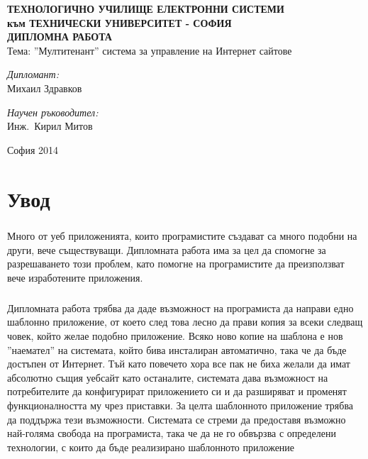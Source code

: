 \documentclass[pdftex,14pt,a4paper]{extreport}
\begin{document}
\setcounter{secnumdepth}{3}
\setcounter{tocdepth}{3}
\begin{titlepage}
	\begin{center}
    \textbf{\Large ТЕХНОЛОГИЧНО УЧИЛИЩЕ ЕЛЕКТРОННИ СИСТЕМИ\\[0.2cm]} \textbf{към ТЕХНИЧЕСКИ УНИВЕРСИТЕТ - СОФИЯ\\[6cm]}
		\textbf{\LARGE ДИПЛОМНА РАБОТА\\[4cm]}
		Тема: ''Мултитенант'' система за управление на Интернет сайтове\\[4cm]
		\begin{minipage}{0.4\textwidth}
			\begin{flushleft} \large
				\emph{Дипломант:}\\
				Михаил Здравков
			\end{flushleft}
		\end{minipage}
		\begin{minipage}{0.4\textwidth}
			\begin{flushright} \large
				\emph{Научен ръководител:} \\
				Инж.~Кирил Митов
			\end{flushright}
		\end{minipage}

		\vfill

		{\large София 2014}

	\end{center}
\end{titlepage}
\tableofcontents
\pagebreak
{}
\chapter*{Увод}
\paragraph {}
Много от уеб приложенията, които програмистите създават са много подобни на други, вече съществуващи. Дипломната работа има за цел да спомогне за разрешаването този проблем, като помогне на програмистите да преизползват вече изработените приложения.
\paragraph {} Дипломната работа трябва да даде възможност на програмиста да направи едно шаблонно приложение, от което след това лесно да прави копия за всеки следващ човек, който желае подобно приложение. Всяко ново копие на шаблона е нов ''наемател'' на системата, който бива инсталиран автоматично, така че да бъде достъпен от Интернет. Тъй като повечето хора все пак не биха желали да имат абсолютно същия уебсайт като останалите, системата дава възможност на потребителите да конфигурират приложението си и да разширяват и променят функционалността му чрез приставки. За целта шаблонното приложение трябва да поддържа тези възможности. Системата се стреми да предоставя възможно най-голяма свобода на програмиста, така че да не го обвързва с определени технологии, с които да бъде реализирано шаблонното приложение
\end{document}

